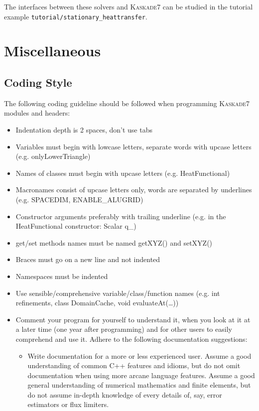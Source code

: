 \documentclass[11pt]{article}
\newcommand{\K}{\textsc{Kaskade7 }}
\begin{document}
\noindent The interfaces between these solvers and \K can be studied in the tutorial example
{\tt tutorial/stationary\_heattransfer}.



\section{Miscellaneous} \label{misc}

\subsection{Coding Style}
The following coding guideline should be followed when programming \K modules and headers:
\begin{itemize}
\item Indentation depth is 2 spaces, don't use tabs
\item Variables must begin with lowcase letters, separate words with upcase letters (e.g. onlyLowerTriangle)
\item Names of classes must begin with upcase letters (e.g. HeatFunctional)
\item Macronames consist of upcase letters only, words are separated by underlines (e.g. SPACEDIM, ENABLE\_ALUGRID)
\item Constructor arguments preferably with trailing underline (e.g. in the HeatFunctional constructor: Scalar q\_)
\item get/set methods names must be named getXYZ() and setXYZ()
\item Braces must go on a new line and not indented
\item Namespaces must be indented
\item Use sensible/comprehensive variable/class/function names (e.g. int refinements, class DomainCache, void evaluateAt(\dots))
\item Comment your program for yourself to understand it, when you look at it at a later time (one year after programming) and for
other users to easily comprehend and use it. Adhere to the following documentation suggestions:
  \begin{itemize}
   \item Write documentation for a more or less experienced user. Assume a good understanding of common C++ features and idioms,
           but do not omit documentation when using more arcane language features. Assume a good general understanding of numerical
           mathematics and finite elements, but do not assume in-depth knowledge of every details of, say, error estimators or flux limiters.

\end{itemize}
\end{itemize}
\end{document}
